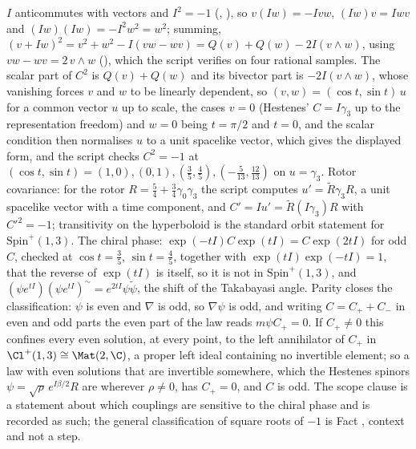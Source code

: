 $I$ anticommutes with vectors and $I^{2} = -1$ (, ), so $v(Iw) = -Ivw$, $(Iw)v = Iwv$ and $(Iw)(Iw) = -I^{2}w^{2} = w^{2}$; summing, $(v + Iw)^{2} = v^{2} + w^{2} - I(vw - wv) = Q(v) + Q(w) - 2I(v \wedge w)$, using $vw - wv = 2\,v \wedge w$ (), which the script verifies on four rational samples. The scalar part of $C^{2}$ is $Q(v) + Q(w)$ and its bivector part is $-2I(v \wedge w)$, whose vanishing forces $v$ and $w$ to be linearly dependent, so $(v, w) = (\cos t, \sin t)\,u$ for a common vector $u$ up to scale, the cases $v = 0$ (Hestenes' $C = I\gamma_{3}$ up to the representation freedom) and $w = 0$ being $t = \pi/2$ and $t = 0$, and the scalar condition then normalises $u$ to a unit spacelike vector, which gives the displayed form, and the script checks $C^{2} = -1$ at $(\cos t, \sin t) = (1, 0), (0, 1), (\tfrac35, \tfrac45), (-\tfrac{5}{13}, \tfrac{12}{13})$ on $u = \gamma_{3}$. Rotor covariance: for the rotor $R = \tfrac54 + \tfrac34\gamma_{0}\gamma_{3}$ the script computes $u' = \tilde{R}\gamma_{3}R$, a unit spacelike vector with a time component, and $C' = Iu' = \tilde{R}(I\gamma_{3})R$ with $C'^{2} = -1$; transitivity on the hyperboloid is the standard orbit statement for $\mathrm{Spin}^{+}(1,3)$. The chiral phase: $\exp(-tI)C\exp(tI) = C\exp(2tI)$ for odd $C$, checked at $\cos t = \tfrac35$, $\sin t = \tfrac45$, together with $\exp(tI)\exp(-tI) = 1$, that the reverse of $\exp(tI)$ is itself, so it is not in $\mathrm{Spin}^{+}(1,3)$, and $(\psi e^{tI})(\psi e^{tI})^{\sim} = e^{2tI}\psi\tilde{\psi}$, the shift of the Takabayasi angle. Parity closes the classification: $\psi$ is even and $\nabla$ is odd, so $\nabla\psi$ is odd, and writing $C = C_{+} + C_{-}$ in even and odd parts the even part of the law reads $m\psi C_{+} = 0$. If $C_{+} \neq 0$ this confines every even solution, at every point, to the left annihilator of $C_{+}$ in $\Cl^{+}(1,3) \cong \Mat(2, \C)$, a proper left ideal containing no invertible element; so a law with even solutions that are invertible somewhere, which the Hestenes spinors $\psi = \sqrt{\rho}\,e^{I\beta/2}R$ are wherever $\rho \neq 0$, has $C_{+} = 0$, and $C$ is odd. The scope clause is a statement about which couplings are sensitive to the chiral phase and is recorded as such; the general classification of square roots of $-1$ is Fact , context and not a step.
